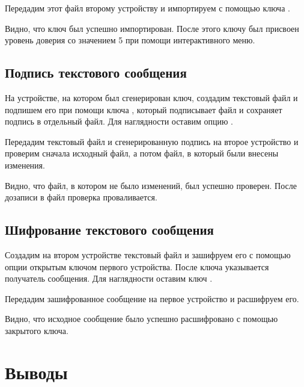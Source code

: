 

Передадим этот файл второму устройству и импортируем с помощью ключа .



Видно, что ключ был успешно импортирован. После этого ключу был присвоен уровень доверия со значением 5 при помощи интерактивного меню.



\subsection{Подпись текстового сообщения}

На устройстве, на котором был сгенерирован ключ, создадим текстовый файл  и подпишем его при помощи ключа , который подписывает файл и сохраняет подпись в отдельный файл. Для наглядности оставим опцию . 



Передадим текстовый файл и сгенерированную подпись на второе устройство и проверим сначала исходный файл, а потом файл, в который были внесены изменения.



Видно, что файл, в котором не было изменений, был успешно проверен. После дозаписи в файл проверка проваливается. 

\subsection{Шифрование текстового сообщения}

Создадим на втором устройстве текстовый файл  и зашифруем его с помощью опции  открытым ключом первого устройства. После ключа  указывается получатель сообщения. Для наглядности оставим ключ . 



Передадим зашифрованное сообщение на первое устройство и расшифруем его.



Видно, что исходное сообщение было успешно расшифровано с помощью закрытого ключа.

\section{Выводы}

